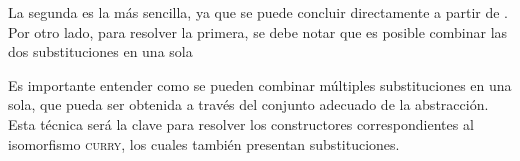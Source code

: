 \documentclass[]{report}
\begin{document}
	\snstar
	\AgdaSymbol{(}\AgdaSpace{}%
	\AgdaSpace{}%
	\AgdaSpace{}%
	\AgdaSymbol{(}\AgdaSpace{}%
	\AgdaSpace{}%
	\AgdaSymbol{)}\AgdaSpace{}%
	\AgdaSpace{}%
	\AgdaSymbol{(}\AgdaSpace{}%
	\AgdaOperator{\AgdaInductiveConstructor{[}}\AgdaSpace{}%
	\AgdaSpace{}%
	\AgdaOperator{\AgdaInductiveConstructor{]≡}}\AgdaSpace{}%
	\AgdaSymbol{(}\AgdaSpace{}%
	\AgdaSymbol{)}\AgdaSpace{}%
	\AgdaSpace{}%
	\AgdaSymbol{(}\AgdaSpace{}%
	\AgdaSpace{}%
	\AgdaSymbol{)}
	\AgdaSpace{}%
	\AgdaSymbol{))}
	
	\snstar
	\AgdaSymbol{(}\AgdaSpace{}%
	\AgdaOperator{\AgdaInductiveConstructor{[}}\AgdaSpace{}%
	\AgdaSpace{}%
	\AgdaOperator{\AgdaInductiveConstructor{]≡}}\AgdaSpace{}%
	\AgdaSymbol{(}\AgdaSpace{}%
	\AgdaSymbol{)}\AgdaSpace{}%
	\AgdaSpace{}%
	\AgdaSymbol{(}\AgdaSpace{}%
	\AgdaSpace{}%
	\AgdaSymbol{)}
	\AgdaSpace{}%
	\AgdaSymbol{)}
	
	La segunda es la más sencilla, ya que se puede concluir directamente a partir de .
	Por otro lado, para resolver la primera, se debe notar que es posible combinar las dos substituciones en una sola 
	\AgdaSpace{}%
	\AgdaSymbol{(}\AgdaOperator{\AgdaInductiveConstructor{[}}\AgdaSpace{}%
	\AgdaSpace{}%
	\AgdaOperator{\AgdaInductiveConstructor{]≡}}\AgdaSpace{}%
	\AgdaSymbol{)}\AgdaSpace{}%
	\AgdaSpace{}%
	\AgdaSpace{}%
	\AgdaSpace{}%
	\AgdaSpace{}%
	\AgdaSpace{}%
	
	
	Es importante entender como se pueden combinar múltiples substituciones en una sola, que pueda ser obtenida a través del conjunto adecuado de la abstracción.
	Esta técnica será la clave para resolver los constructores correspondientes al isomorfismo \textsc{curry}, los cuales también presentan substituciones.
	
\end{document}
